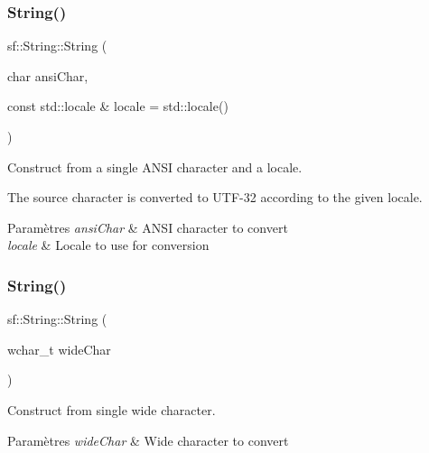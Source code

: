 \subsubsection{\texorpdfstring{String()}{String()}\hspace{0.1cm}{\footnotesize\ttfamily [2/11]}}
{\footnotesize\ttfamily sf\+::\+String\+::\+String (\begin{DoxyParamCaption}\item[{char}]{ansi\+Char,  }\item[{const std\+::locale \&}]{locale = {\ttfamily std\+:\+:locale()} }\end{DoxyParamCaption})}



Construct from a single A\+N\+SI character and a locale. 

The source character is converted to U\+T\+F-\/32 according to the given locale.


\begin{DoxyParams}{Paramètres}
{\em ansi\+Char} & A\+N\+SI character to convert \\
\hline
{\em locale} & Locale to use for conversion \\
\hline
\end{DoxyParams}
\mbox{\label{classsf_1_1String_aefaa202d2aa5ff85b4f75a5983367e86}} 
\subsubsection{\texorpdfstring{String()}{String()}\hspace{0.1cm}{\footnotesize\ttfamily [3/11]}}
{\footnotesize\ttfamily sf\+::\+String\+::\+String (\begin{DoxyParamCaption}\item[{wchar\+\_\+t}]{wide\+Char }\end{DoxyParamCaption})}



Construct from single wide character. 


\begin{DoxyParams}{Paramètres}
{\em wide\+Char} & Wide character to convert \\
\hline
\end{DoxyParams}
\mbox{\label{classsf_1_1String_a8e1a5027416d121187908e2ed77079ff}} 
